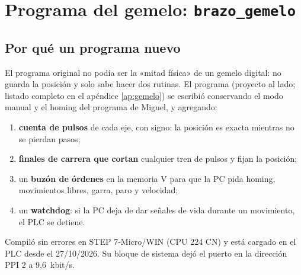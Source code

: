 \chapter{Programa del gemelo: \texttt{brazo\_gemelo}}\label{cap:gemeloplc}

\section{Por qué un programa nuevo}
El programa original no podía ser la «mitad física» de un gemelo digital: no guarda la posición y solo sabe hacer dos rutinas. El programa  (proyecto  al lado; listado completo en el apéndice \ref{ap:gemelo}) se escribió conservando el modo manual y el homing del programa de Miguel, y agregando:
\begin{enumerate}
\item \textbf{cuenta de pulsos} de cada eje, con signo: la posición es exacta mientras no se pierdan pasos;
\item \textbf{finales de carrera que cortan} cualquier tren de pulsos y fijan la posición;
\item un \textbf{buzón de órdenes} en la memoria V para que la PC pida homing, movimientos libres, garra, paro y velocidad;
\item un \textbf{watchdog}: si la PC deja de dar señales de vida durante un movimiento, el PLC se detiene.
\end{enumerate}
Compiló sin errores en STEP 7-Micro/WIN (CPU 224 CN) y está cargado en el PLC desde el 27/10/2026. Su bloque de sistema dejó el puerto en la dirección PPI 2 a 9,6~kbit/s.

